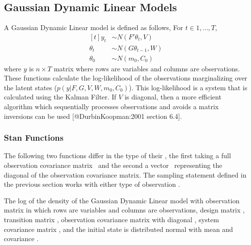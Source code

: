 \begin{description}
\section{Gaussian Dynamic Linear Models}


A Gaussian Dynamic Linear model is defined as follows, For $t \in 1, \dots, T$, \[   \begin{aligned}[t]     y_{t} &\sim N(F' \theta_{t}, V) \\     \theta_{t} &\sim N(G \theta_{t - 1}, W) \\     \theta_{0} &\sim N(m_{0}, C_{0})   \end{aligned} \] where $y$ is $n \times T$ matrix where rows are variables and columns are observations. These functions calculate the log-likelihood of the observations marginalizing over the latent states ($p(y | F, G, V, W, m_{0}, C_{0})$). This log-likelihood is a system that is calculated using the Kalman Filter. If $V$ is diagonal, then a more efficient algorithm which sequentially processes observations and avoids a matrix inversions can be used [@DurbinKoopman:2001 section 6.4].




\subsubsection{Stan Functions}


The following two functions differ in the type of their , the first taking a full observation covariance matrix \ and the second a vector \ representing the diagonal of the observation covariance matrix.  The sampling statement defined in the previous section works with either type of observation .


\begin{description}   {The log of the density of the Gaussian Dynamic   Linear model with observation matrix  in which rows are   variables and columns are observations, design matrix ,   transition matrix , observation covariance matrix with   diagonal , system covariance matrix , and the   initial state is distributed normal with mean  and   covariance .} \end{description}



\end{description}
